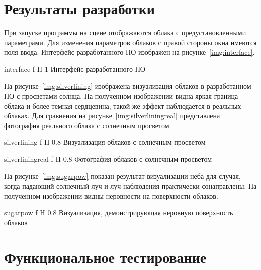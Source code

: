 \section{Результаты разработки}

При запуске программы на сцене отображаются облака с предустановленными параметрами. Для изменения параметров облаков с правой стороны окна имеются поля ввода. Интерфейс разработанного ПО изображен на рисунке~\ref{img:interface}.


{interface} %
{f} %
{H} %
{1\textwidth} %
{Интерфейс разработанного ПО} %


На рисунке~\ref{img:silverlining} изображена визуализация облаков в разработанном ПО с просветами солнца. На полученном изображении видна яркая граница облака и более темная сердцевина, такой же эффект наблюдается в реальных облаках. Для сравнения на рисунке~\ref{img:silverliningreal} представлена фотография реального облака с солнечным просветом.

{silverlining} %
{f} %
{H} %
{0.8\textwidth} %
{Визуализация облаков с солнечным просветом} %


{silverliningreal} %
{f} %
{H} %
{0.8\textwidth} %
{Фотография облаков с солнечным просветом} %

На рисунке~\ref{img:sugarpow} показан результат визуализации неба для случая, когда падающий солнечный луч и луч наблюдения практически сонаправлены. На полученном изображении видны неровности на поверхности облаков. 

{sugarpow} %
{f} %
{H} %
{0.8\textwidth} %
{Визуализация, демонстрирующая неровную поверхность облаков} %

\clearpage

\section{Функциональное тестирование}

